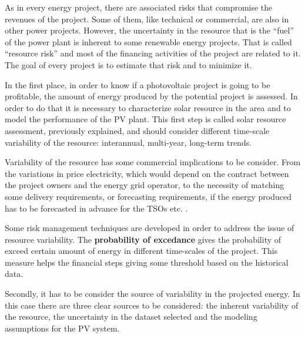 As in every energy project, there are associated risks that compromise the revenues of the project. Some of them, like technical or commercial, are also in other power projects. However, the uncertainty in the resource that is the ``fuel'' of the power plant is inherent to some renewable energy projects. That is called ``resource risk'' and most of the financing activities of the project are related to it. The goal of every project is to estimate that risk and to minimize it.

In the first place, in order to know if a photovoltaic project is going to be profitable, the amount of energy produced by the potential project is assessed. In order to do that it is necessary to characterize solar resource in the area and to model the performance of the PV plant. This first step is called solar resource assessment, previously explained,  and should consider different time-scale variability of the resource: interannual, multi-year, long-term trends. 
 


Variability of the resource has some commercial implications to be consider. From the variations in price electricity, which would depend on the contract between the project owners and the energy grid operator, to the necessity of matching some delivery requirements, or forecasting requirements, if the energy produced has to be forecasted in advance for the TSOs etc. \cite*{MCMAHAN201381}.

Some risk management techniques are developed in order to address the issue of resource variability. The \textbf{probability of excedance} gives the probability of exceed certain amount of energy in different time-scales of the project. This measure helps the financial steps giving some threshold based on the historical data.

Secondly, it has to be consider the source of variability in the projected energy. In this case there are three clear sources to be considered: the inherent variability of the resource, the uncertainty in the dataset selected and the modeling assumptions for the PV system.

